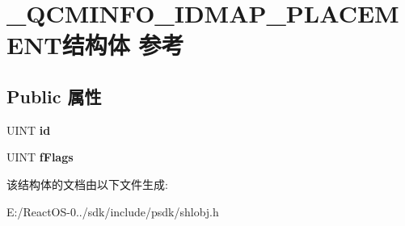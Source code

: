\hypertarget{struct___q_c_m_i_n_f_o___i_d_m_a_p___p_l_a_c_e_m_e_n_t}{}\section{\+\_\+\+Q\+C\+M\+I\+N\+F\+O\+\_\+\+I\+D\+M\+A\+P\+\_\+\+P\+L\+A\+C\+E\+M\+E\+N\+T结构体 参考}
\label{struct___q_c_m_i_n_f_o___i_d_m_a_p___p_l_a_c_e_m_e_n_t}
\subsection*{Public 属性}
\begin{DoxyCompactItemize}
\item 
\mbox{\label{struct___q_c_m_i_n_f_o___i_d_m_a_p___p_l_a_c_e_m_e_n_t_a736de1f907f9abc6f03e43b536aa3cf3}} 
U\+I\+NT {\bfseries id}
\item 
\mbox{\label{struct___q_c_m_i_n_f_o___i_d_m_a_p___p_l_a_c_e_m_e_n_t_a374ac40a0fa1944ff684cfda5e9f9e4c}} 
U\+I\+NT {\bfseries f\+Flags}
\end{DoxyCompactItemize}


该结构体的文档由以下文件生成\+:\begin{DoxyCompactItemize}
\item 
E\+:/\+React\+O\+S-\/0../sdk/include/psdk/shlobj.\+h\end{DoxyCompactItemize}
